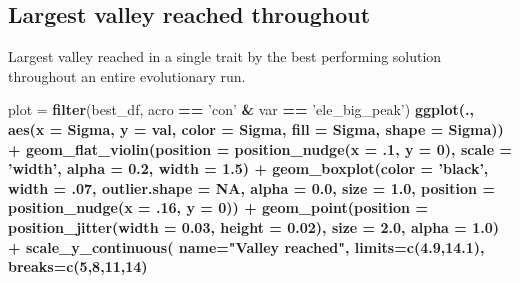 \documentclass[]{book}
\newenvironment{Shaded}{\begin{snugshade}}{\end{snugshade}}
\newcommand{\DataTypeTok}[1]{\textcolor[rgb]{0.13,0.29,0.53}{#1}}
\newcommand{\DecValTok}[1]{\textcolor[rgb]{0.00,0.00,0.81}{#1}}
\newcommand{\FloatTok}[1]{\textcolor[rgb]{0.00,0.00,0.81}{#1}}
\newcommand{\KeywordTok}[1]{\textcolor[rgb]{0.13,0.29,0.53}{\textbf{#1}}}
\newcommand{\NormalTok}[1]{#1}
\newcommand{\OperatorTok}[1]{\textcolor[rgb]{0.81,0.36,0.00}{\textbf{#1}}}
\newcommand{\OtherTok}[1]{\textcolor[rgb]{0.56,0.35,0.01}{#1}}
\newcommand{\StringTok}[1]{\textcolor[rgb]{0.31,0.60,0.02}{#1}}
\begin{document}
\hypertarget{largest-valley-reached-throughout-18}{%
\subsection{Largest valley reached throughout}\label{largest-valley-reached-throughout-18}}

Largest valley reached in a single trait by the best performing solution throughout an entire evolutionary run.

\begin{Shaded}
\begin{Highlighting}[]
\NormalTok{plot =}\StringTok{ }\KeywordTok{filter}\NormalTok{(best_df, acro }\OperatorTok{==}\StringTok{ 'con'} \OperatorTok{&}\StringTok{ }\NormalTok{var }\OperatorTok{==}\StringTok{ 'ele_big_peak'}\NormalTok{) }\OperatorTok{%>%}
\StringTok{  }\KeywordTok{ggplot}\NormalTok{(., }\KeywordTok{aes}\NormalTok{(}\DataTypeTok{x =}\NormalTok{ Sigma, }\DataTypeTok{y =}\NormalTok{ val, }\DataTypeTok{color =}\NormalTok{ Sigma, }\DataTypeTok{fill =}\NormalTok{ Sigma, }\DataTypeTok{shape =}\NormalTok{ Sigma)) }\OperatorTok{+}
\StringTok{  }\KeywordTok{geom_flat_violin}\NormalTok{(}\DataTypeTok{position =} \KeywordTok{position_nudge}\NormalTok{(}\DataTypeTok{x =} \FloatTok{.1}\NormalTok{, }\DataTypeTok{y =} \DecValTok{0}\NormalTok{), }\DataTypeTok{scale =} \StringTok{'width'}\NormalTok{, }\DataTypeTok{alpha =} \FloatTok{0.2}\NormalTok{, }\DataTypeTok{width =} \FloatTok{1.5}\NormalTok{) }\OperatorTok{+}
\StringTok{  }\KeywordTok{geom_boxplot}\NormalTok{(}\DataTypeTok{color =} \StringTok{'black'}\NormalTok{, }\DataTypeTok{width =} \FloatTok{.07}\NormalTok{, }\DataTypeTok{outlier.shape =} \OtherTok{NA}\NormalTok{, }\DataTypeTok{alpha =} \FloatTok{0.0}\NormalTok{, }\DataTypeTok{size =} \FloatTok{1.0}\NormalTok{, }\DataTypeTok{position =} \KeywordTok{position_nudge}\NormalTok{(}\DataTypeTok{x =} \FloatTok{.16}\NormalTok{, }\DataTypeTok{y =} \DecValTok{0}\NormalTok{)) }\OperatorTok{+}
\StringTok{  }\KeywordTok{geom_point}\NormalTok{(}\DataTypeTok{position =} \KeywordTok{position_jitter}\NormalTok{(}\DataTypeTok{width =} \FloatTok{0.03}\NormalTok{, }\DataTypeTok{height =} \FloatTok{0.02}\NormalTok{), }\DataTypeTok{size =} \FloatTok{2.0}\NormalTok{, }\DataTypeTok{alpha =} \FloatTok{1.0}\NormalTok{) }\OperatorTok{+}
\StringTok{  }\KeywordTok{scale_y_continuous}\NormalTok{(}
    \DataTypeTok{name=}\StringTok{"Valley reached"}\NormalTok{,}
    \DataTypeTok{limits=}\KeywordTok{c}\NormalTok{(}\FloatTok{4.9}\NormalTok{,}\FloatTok{14.1}\NormalTok{),}
    \DataTypeTok{breaks=}\KeywordTok{c}\NormalTok{(}\DecValTok{5}\NormalTok{,}\DecValTok{8}\NormalTok{,}\DecValTok{11}\NormalTok{,}\DecValTok{14}\NormalTok{)}
}
\end{Highlighting}
\end{Shaded}
\end{document}
